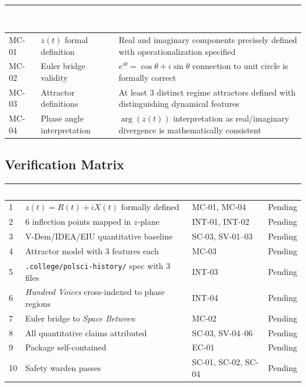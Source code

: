 \documentclass[11pt,letterpaper]{article}
\newcommand{\tableheader}[1]{\textbf{\sffamily\textcolor{white}{#1}}}
\begin{document}
\begin{center}
\begin{tabularx}{\textwidth}{L{1.5cm}L{4cm}X}
\toprule
{}
\tableheader{Test ID} & \tableheader{Verifies} & \tableheader{Expected Result} \\
\midrule
MC-01 & $z(t)$ formal definition & Real and imaginary components precisely defined with operationalization specified \\
MC-02 & Euler bridge validity & $e^{i\theta} = \cos\theta + i\sin\theta$ connection to unit circle is formally correct \\
MC-03 & Attractor definitions & At least 3 distinct regime attractors defined with distinguishing dynamical features \\
MC-04 & Phase angle interpretation & $\arg(z(t))$ interpretation as real/imaginary divergence is mathematically consistent \\
\bottomrule
\end{tabularx}
\end{center}

\subsection{Verification Matrix}

\begin{center}
\begin{tabularx}{\textwidth}{C{0.5cm}X L{3cm} C{2cm}}
\toprule
{}
\tableheader{\#} & \tableheader{Success Criterion} & \tableheader{Test IDs} & \tableheader{Status} \\
 & $z(t) = R(t) + iX(t)$ formally defined & MC-01, MC-04 & Pending \\
2 & 6 inflection points mapped in $z$-plane & INT-01, INT-02 & Pending \\
3 & V-Dem/IDEA/EIU quantitative baseline & SC-03, SV-01--03 & Pending \\
4 & Attractor model with 3 features each & MC-03 & Pending \\
5 & \texttt{.college/polsci-history/} spec with 3 files & INT-03 & Pending \\
6 & \textit{Hundred Voices} cross-indexed to phase regions & INT-04 & Pending \\
7 & Euler bridge to \textit{Space Between} & MC-02 & Pending \\
8 & All quantitative claims attributed & SC-03, SV-04--06 & Pending \\
9 & Package self-contained & EC-01 & Pending \\
10 & Safety warden passes & SC-01, SC-02, SC-04 & Pending \\
\bottomrule
\end{tabularx}
\end{center}
\end{document}
